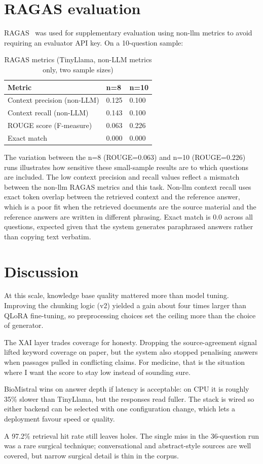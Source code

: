 \section{RAGAS evaluation}

RAGAS~\cite{es2023ragas} was used for supplementary evaluation using non-\ac{llm} metrics to avoid requiring an evaluator API key. On a 10-question sample:

\begin{table}[htbp]
\centering
\caption{RAGAS metrics (TinyLlama, non-LLM metrics only, two sample sizes)}
\renewcommand{\arraystretch}{1.3}
\begin{tabular}{|l|l|l|}
\hline
\textbf{Metric} & \textbf{n=8} & \textbf{n=10} \\
\hline
Context precision (non-LLM) & 0.125 & 0.100 \\
Context recall (non-LLM) & 0.143 & 0.100 \\
ROUGE score (F-measure) & 0.063 & 0.226 \\
Exact match & 0.000 & 0.000 \\
\hline
\end{tabular}
\end{table}

The variation between the n=8 (ROUGE=0.063) and n=10 (ROUGE=0.226) runs illustrates how sensitive these small-sample results are to which questions are included. The low context precision and recall values reflect a mismatch between the non-\ac{llm} RAGAS metrics and this task. Non-\ac{llm} context recall uses exact token overlap between the retrieved context and the reference answer, which is a poor fit when the retrieved documents are the source material and the reference answers are written in different phrasing. Exact match is 0.0 across all questions, expected given that the system generates paraphrased answers rather than copying text verbatim.

\section{Discussion}

At this scale, knowledge base quality mattered more than model tuning. Improving the chunking logic (v2) yielded a gain about four times larger than QLoRA fine-tuning, so preprocessing choices set the ceiling more than the choice of generator.

The XAI layer trades coverage for honesty. Dropping the source-agreement signal lifted keyword coverage on paper, but the system also stopped penalising answers when passages pulled in conflicting claims. For medicine, that is the situation where I want the score to stay low instead of sounding sure.

BioMistral wins on answer depth if latency is acceptable: on CPU it is roughly 35\% slower than TinyLlama, but the responses read fuller. The stack is wired so either backend can be selected with one configuration change, which lets a deployment favour speed or quality.

A 97.2\% retrieval hit rate still leaves holes. The single miss in the 36-question run was a rare surgical technique; conversational and abstract-style sources are well covered, but narrow surgical detail is thin in the corpus.
